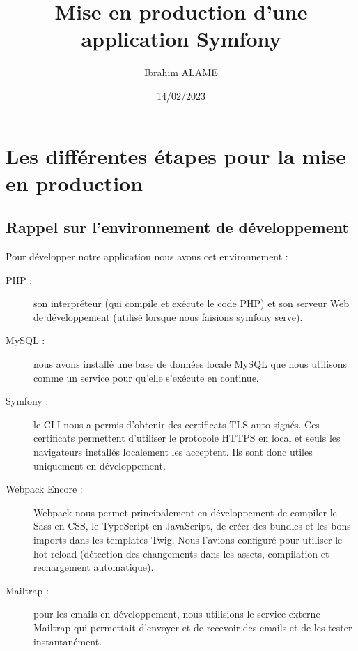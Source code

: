 \documentclass{article}
\title{Mise en production d'une application Symfony}
\author{Ibrahim ALAME}
\date{14/02/2023}
\begin{document}
\maketitle

\section{Les différentes étapes pour la mise en production}  
\subsection{Rappel sur l'environnement de développement}  

Pour développer notre application nous avons cet environnement :
\begin{description}
    \item[PHP :]  son interpréteur (qui compile et exécute le code PHP) et son serveur Web de développement (utilisé lorsque nous faisions symfony serve).

    \item[MySQL :] nous avons installé une base de données locale MySQL que nous utilisons comme un service pour qu'elle s'exécute en continue.

    \item[Symfony :] le CLI nous a permis d'obtenir des certificats TLS auto-signés. Ces certificats permettent d'utiliser le protocole HTTPS en local et seuls les navigateurs installés localement les acceptent. Ils sont donc utiles uniquement en développement.

    \item[Webpack Encore :] Webpack nous permet principalement en développement de compiler le Sass en CSS, le TypeScript en JavaScript, de créer des bundles et les bons imports dans les templates Twig. Nous l'avions configuré pour utiliser le hot reload (détection des changements dans les assets, compilation et rechargement automatique).

    \item[Mailtrap :] pour les emails en développement, nous utilisions le service externe Mailtrap qui permettait d'envoyer et de recevoir des emails et de les tester instantanément.

\end{description}
\end{document}
